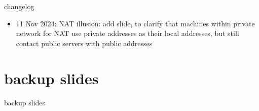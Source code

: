 \date{}
\title{}
\date{}

\begin{frame}
    \titlepage
\end{frame}



{\changelogmode
\begin{frame}{changelog}
    \begin{itemize}
    \item 11 Nov 2024: NAT illusion: add slide, to clarify that machines within private network for NAT use private addresses as their local addresses, but still contact public servers with public addresses
    \end{itemize}
\end{frame}
}




\section{backup slides}
\begin{frame}{backup slides}
\end{frame}



